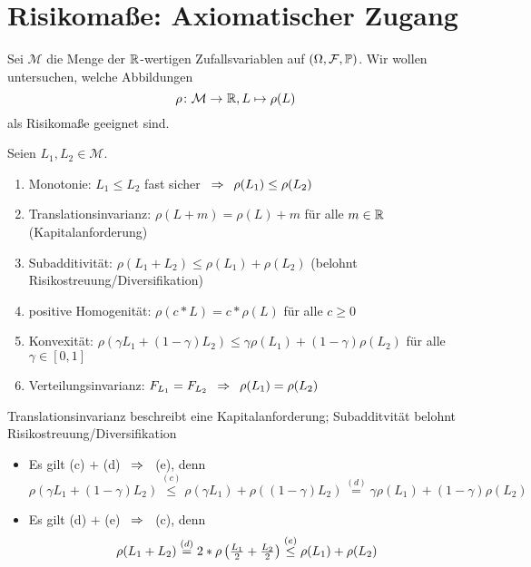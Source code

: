 \section{Risikomaße: Axiomatischer Zugang}

Sei $\mathcal{M}$ die Menge der $\mathbb{R}$-wertigen Zufallsvariablen auf $(\Omega, \mathcal{F}, \mathbb{P})$. Wir wollen untersuchen, welche Abbildungen 
\begin{equation*}
\abb{\rho}{\mathcal{M}}{\R}, L \mapsto \rho(L)
\end{equation*}
als Risikomaße geeignet sind.

\begin{*definition}
	Seien $L_1, L_2 \in \mathcal{M}$.
	\begin{enumerate}[label=(\alph*), nolistsep]
		\item Monotonie: $L_1 \le L_2$ fast sicher $\enskip \Rightarrow \enskip \rho(L_1) \le \rho(L_2)$
		\item Translationsinvarianz: $\rho(L + m) = \rho(L) + m$ für alle $m \in \mathbb{R}$ (Kapitalanforderung)
		\item Subadditivität: $\rho(L_1 + L_2) \le \rho(L_1) + \rho(L_2)$ (belohnt Risikostreuung/Diversifikation)
		\item positive Homogenität: $\rho(c * L) = c * \rho(L)$ für alle $c \ge 0$
		\item Konvexität: $\rho(\gamma L_1 + (1-\gamma) L_2) \le \gamma \rho(L_1) + (1-\gamma) \rho(L_2)$ für alle $\gamma \in [0,1]$
		\item Verteilungsinvarianz: $F_{L_1} = F_{L_2} \enskip \Rightarrow \enskip \rho(L_1) = \rho(L_2)$
	\end{enumerate}
\end{*definition}

\begin{*bemerkung}
	Translationsinvarianz beschreibt eine Kapitalanforderung; Subadditvität belohnt Risikostreuung/Diversifikation
	\begin{itemize}[nolistsep]
		\item Es gilt (c) $+$ (d) $\enskip \Rightarrow \enskip$ (e), denn
		\begin{equation*}
		\rho(\gamma L_1 + (1-\gamma) L_2) \overset{(c)}{\le} \rho(\gamma L_1) + \rho((1-\gamma) L_2) \overset{(d)}{=} \gamma \rho(L_1) + (1-\gamma) \rho(L_2)
		\end{equation*}
		\item Es gilt (d) $+$ (e) $\enskip \Rightarrow \enskip$ (c), denn
		\begin{equation*}
		\rho(L_1 + L_2) \overset{(d)}{=} 2 * \rho \left( \tfrac{L_1}{2} + \tfrac{L_2}{2} \right) \overset{(e)}{\le} \rho(L_1) + \rho(L_2)
		\end{equation*}
	\end{itemize}
\end{*bemerkung}

